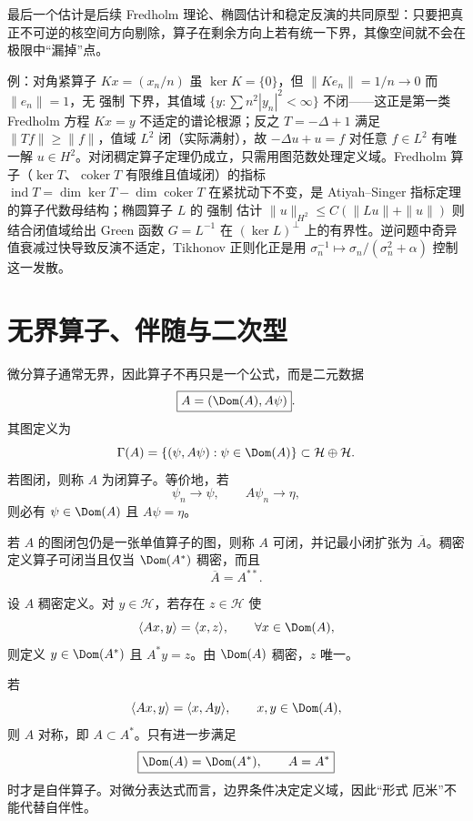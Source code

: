 最后一个估计是后续 Fredholm 理论、椭圆估计和稳定反演的共同原型：只要把真正不可逆的核空间方向剔除，算子在剩余方向上若有统一下界，其像空间就不会在极限中``漏掉''点。

例：对角紧算子 $Kx=(x_n/n)$ 虽 $\ker K=\{0\}$，但 $\|Ke_n\|=1/n\to0$ 而 $\|e_n\|=1$，无 强制 下界，其值域 $\{y:\sum n^2|y_n|^2<\infty\}$ 不闭——这正是第一类 Fredholm 方程 $Kx=y$ 不适定的谱论根源；反之 $T=-\Delta+1$ 满足 $\|Tf\|\ge\|f\|$，值域 $L^2$ 闭（实际满射），故 $-\Delta u+u=f$ 对任意 $f\in L^2$ 有唯一解 $u\in H^2$。对闭稠定算子定理仍成立，只需用图范数处理定义域。Fredholm 算子（$\ker T$、$\operatorname{coker}T$ 有限维且值域闭）的指标 $\operatorname{ind}T=\dim\ker T-\dim\operatorname{coker}T$ 在紧扰动下不变，是 Atiyah--Singer 指标定理的算子代数母结构；椭圆算子 $L$ 的 强制 估计 $\|u\|_{H^2}\le C(\|Lu\|+\|u\|)$ 则结合闭值域给出 Green 函数 $G=L^{-1}$ 在 $(\ker L)^\perp$ 上的有界性。逆问题中奇异值衰减过快导致反演不适定，Tikhonov 正则化正是用 $\sigma_n^{-1}\mapsto\sigma_n/(\sigma_n^2+\alpha)$ 控制这一发散。

\section{无界算子、伴随与二次型}
\begin{definition}[算子的图与闭性]
微分算子通常无界，因此算子不再只是一个公式，而是二元数据
\[
\boxed{A=(\Dom(A),A\psi)}.
\]
其图定义为
\[
\Gamma(A)=\{(\psi,A\psi):\psi\in\Dom(A)\}\subset\mathcal H\oplus\mathcal H.
\]
若图闭，则称 $A$ 为闭算子。等价地，若
\[
\psi_n\to\psi,
\qquad
A\psi_n\to\eta,
\]
则必有 $\psi\in\Dom(A)$ 且 $A\psi=\eta$。
\end{definition}

\begin{proposition}[可闭性与双伴随]
若 $A$ 的图闭包仍是一张单值算子的图，则称 $A$ 可闭，并记最小闭扩张为 $\overline A$。稠密定义算子可闭当且仅当 $\Dom(A^*)$ 稠密，而且
\[
\boxed{\overline A=A^{**}}.
\]
\end{proposition}

\begin{definition}[稠密定义算子的伴随]
设 $A$ 稠密定义。对 $y\in\mathcal H$，若存在 $z\in\mathcal H$ 使
\[
\langle Ax,y\rangle=\langle x,z\rangle,
\qquad \forall x\in\Dom(A),
\]
则定义 $y\in\Dom(A^*)$ 且 $A^*y=z$。由 $\Dom(A)$ 稠密，$z$ 唯一。
\end{definition}

\begin{definition}[对称算子与自伴算子]
若
\[
\langle Ax,y\rangle=\langle x,Ay\rangle,
\qquad x,y\in\Dom(A),
\]
则 $A$ 对称，即 $A\subset A^*$。只有进一步满足
\[
\boxed{\Dom(A)=\Dom(A^*),\qquad A=A^*}
\]
时才是自伴算子。对微分表达式而言，边界条件决定定义域，因此“形式 厄米”不能代替自伴性。
\end{definition}


